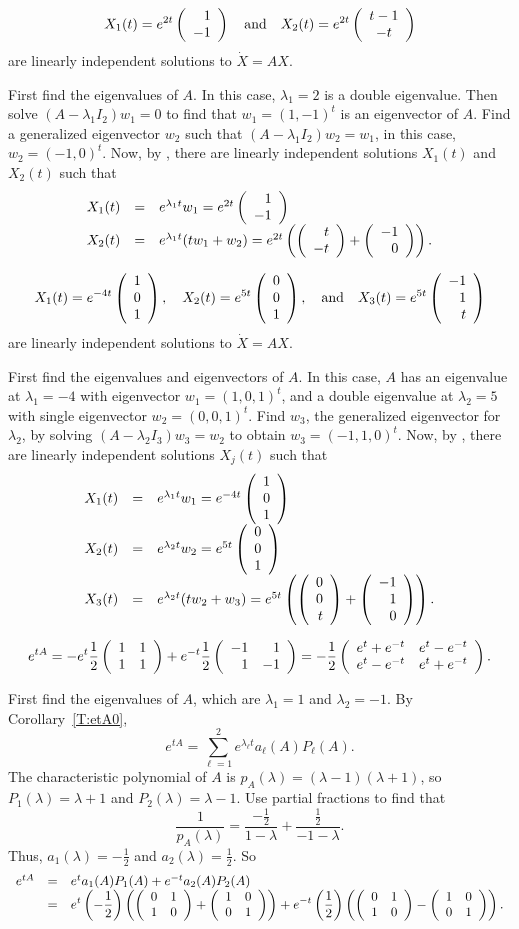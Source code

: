 \documentclass{ximera}
\begin{document}
 \ans
\[
X_1(t) = e^{2t}\left(\begin{array}{r} 1 \\ -1\end{array}\right) \quad\mbox{and}\quad
X_2(t) = e^{2t}\left(\begin{array}{c} t - 1 \\ -t\end{array}\right)
\]
are linearly independent solutions to $\dot{X} = AX$.

\soln First find the eigenvalues of $A$.  In this case, $\lambda_1 = 2$
is a double eigenvalue.  Then solve $(A - \lambda_1 I_2)w_1 = 0$ to
find that $w_1 = (1,-1)^t$ is an eigenvector of $A$.  Find a
generalized eigenvector $w_2$ such that $(A - \lambda_1 I_2)w_2 =
w_1$, in this case, $w_2 = (-1,0)^t$.  Now, by ,
there are linearly independent solutions $X_1(t)$ and $X_2(t)$ such that
\[
\begin{array}{rcl}
X_1(t) & = & e^{\lambda_1 t}w_1 = e^{2t}\left(\begin{array}{r} 1 \\ -1\end{array}\right) \\
X_2(t) & = & e^{\lambda_1 t}(tw_1 + w_2) = e^{2t}\left(\left(\begin{array}{r} t \\ -t\end{array}\right) +
\left(\begin{array}{r} -1 \\ 0\end{array}\right)\right).
\end{array}
\]

 \ans
\[
X_1(t) = e^{-4t}\left(\begin{array}{r} 1 \\ 0 \\ 1\end{array}\right), \quad
X_2(t) = e^{5t}\left(\begin{array}{r} 0 \\ 0 \\ 1\end{array}\right), \quad\mbox{and}\quad
X_3(t) = e^{5t}\left(\begin{array}{r} -1 \\ 1 \\ t\end{array}\right)
\]
are linearly independent solutions to $\dot{X} = AX$.

\soln First find the eigenvalues and eigenvectors of $A$.  In this case,
$A$ has an eigenvalue at $\lambda_1 = -4$ with eigenvector $w_1 =
(1,0,1)^t$, and a double eigenvalue at $\lambda_2 = 5$ with single
eigenvector $w_2 = (0,0,1)^t$.  Find $w_3$, the generalized
eigenvector for $\lambda_2$, by solving $(A - \lambda_2 I_3)w_3 = w_2$
to obtain $w_3 = (-1,1,0)^t$.  Now, by ,
there are linearly independent solutions $X_j(t)$ such that
\[
\begin{array}{rcl}
X_1(t) & = & e^{\lambda_1 t}w_1 = e^{-4t}\left(\begin{array}{r} 1 \\ 0 \\ 1\end{array}\right) \\
X_2(t) & = & e^{\lambda_2 t}w_2 = e^{5t}\left(\begin{array}{r} 0 \\ 0 \\ 1\end{array}\right) \\
X_3(t) & = & e^{\lambda_2 t}(tw_2 + w_3) = e^{5t}\left(\left(\begin{array}{r} 0 \\ 0 \\ t\end{array}\right)
+ \left(\begin{array}{r} -1 \\ 1 \\ 0\end{array}\right)\right).
\end{array}
\]

 \ans
\[
e^{tA} = -e^t\frac{1}{2}\left(\begin{array}{rr} 1 & 1\\ 1 &1\end{array}\right) +
e^{-t}\frac{1}{2}\left(\begin{array}{rr} -1 & 1\\ 1 &-1\end{array}\right)
= -\frac{1}{2}\left(\begin{array}{cc} e^{t} + e^{-t} & e^t - e^{-t}\\ e^t - e^{-t} &e^t + e^{-t}\end{array}\right).
\]

\soln First find the eigenvalues of $A$, which are $\lambda_1 = 1$ and
$\lambda_2 = -1$.  By Corollary~\ref{T:etA0},
\[
e^{tA} = \sum_{\ell = 1}^2 e^{\lambda_\ell t}a_\ell(A)P_\ell(A).
\]
The characteristic polynomial of $A$ is $p_A(\lambda) = (\lambda -
1)(\lambda + 1)$, so $P_1(\lambda) = \lambda + 1$ and $P_2(\lambda) =
\lambda - 1$.  Use partial fractions to find that
\[
\frac{1}{p_A(\lambda)} = \frac{-\frac{1}{2}}{1 - \lambda} + \frac{\frac{1}{2}}
{-1 - \lambda}.
\]
Thus, $a_1(\lambda) = -\frac{1}{2}$ and $a_2(\lambda) = \frac{1}{2}$.  So
\[
\begin{array}{rcl}
e^{tA} & = & e^ta_1(A)P_1(A) + e^{-t}a_2(A)P_2(A) \\
& = & \displaystyle e^t\left(-\frac{1}{2}\right)\left(\left(\begin{array}{rr} 0 & 1\\ 1 &0\end{array}\right) +
\left(\begin{array}{rr} 1 & 0\\ 0 &1\end{array}\right)\right) + e^{-t}\left(\frac{1}{2}\right)
\left(\left(\begin{array}{rr} 0 & 1\\ 1 &0\end{array}\right) - \left(\begin{array}{rr} 1 & 0\\ 0 &1\end{array}\right)\right).
\end{array}
\]
\end{document}

